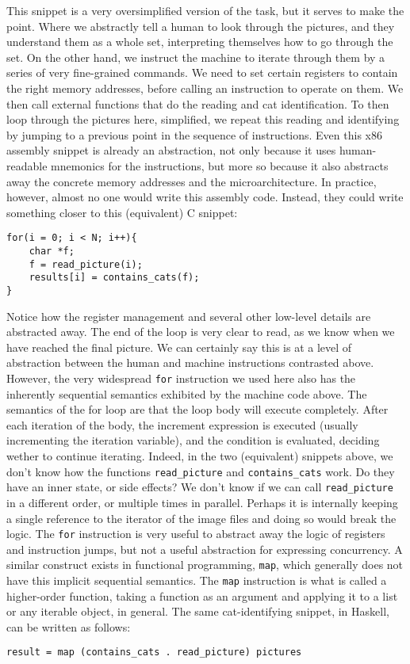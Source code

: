 This snippet is a very oversimplified version of the task, but it serves to make the point.
Where we abstractly tell a human to look through the pictures, and they understand them as a whole set, interpreting themselves how to go through the set.
On the other hand, we instruct the machine to iterate through them by a series of very fine-grained commands.
We need to set certain registers to contain the right memory addresses, before calling an instruction to operate on them.
We then call external functions that do the reading and cat identification.
To then loop through the pictures here, simplified, we repeat this reading and identifying by jumping to a previous point in the sequence of instructions.
Even this x86 assembly snippet is already an abstraction, not only because it uses human-readable mnemonics for the instructions, but more so because it also abstracts away the concrete memory addresses and the microarchitecture.
In practice, however, almost no one would write this assembly code. Instead, they could write something closer to this (equivalent) C snippet:
\begin{verbatim}
for(i = 0; i < N; i++){
    char *f;
    f = read_picture(i);
    results[i] = contains_cats(f); 
}
\end{verbatim}

Notice how the register management and several other low-level details are abstracted away.
The end of the loop is very clear to read, as we know when we have reached the final picture.
We can certainly say this is at a level of abstraction between the human and machine instructions contrasted above.
However, the very widespread \texttt{for} instruction we used here also has the inherently sequential semantics exhibited by the machine code above.
The semantics of the for loop are that the loop body will execute completely.
After each iteration of the body, the increment expression is executed (usually incrementing the iteration variable), and the condition is evaluated, deciding wether to continue iterating.
Indeed, in the two (equivalent) snippets above, we don't know how the functions \texttt{read\_picture} and \texttt{contains\_cats} work.
Do they have an inner state, or side effects?
We don't know if we can call \texttt{read\_picture} in a different order, or multiple times in parallel.
Perhaps it is internally keeping a single reference to the iterator of the image files and doing so would break the logic.
The \texttt{for} instruction is very useful to abstract away the logic of registers and instruction jumps, but not a useful abstraction for expressing concurrency.
A similar construct exists in functional programming, \texttt{map}, which generally does not have this implicit sequential semantics.
The \texttt{map} instruction is what is called a higher-order function, taking a function as an argument and applying it to a list or any iterable object, in general.
The same cat-identifying snippet, in Haskell, can be written as follows:
\begin{verbatim}
result = map (contains_cats . read_picture) pictures
\end{verbatim}

